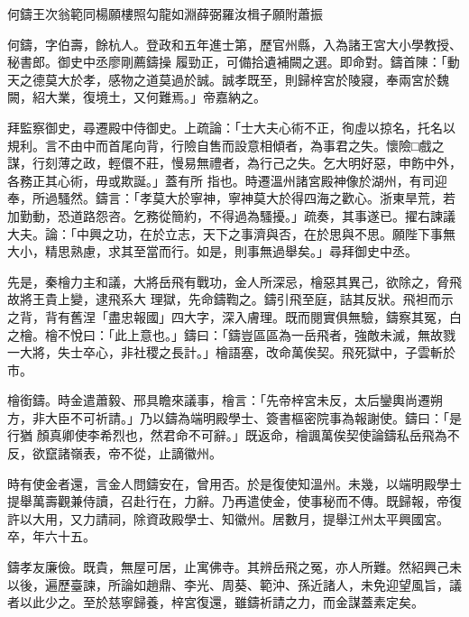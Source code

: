 
\begin{pinyinscope}

 何鑄王次翁範同楊願樓照勾龍如淵薛弼羅汝楫子願附蕭振



 何鑄，字伯壽，餘杭人。登政和五年進士第，歷官州縣，入為諸王宮大小學教授、秘書郎。御史中丞廖剛薦鑄操
 履勁正，可備拾遺補闕之選。即命對。鑄首陳：「動天之德莫大於孝，感物之道莫過於誠。誠孝既至，則歸梓宮於陵寢，奉兩宮於魏闕，紹大業，復境土，又何難焉。」帝嘉納之。



 拜監察御史，尋遷殿中侍御史。上疏論：「士大夫心術不正，徇虛以掠名，托名以規利。言不由中而首尾向背，行險自售而設意相傾者，為事君之失。懷險□戲之謀，行刻薄之政，輕儇不莊，慢易無禮者，為行己之失。乞大明好惡，申飭中外，各務正其心術，毋或欺誕。」蓋有所
 指也。時遷溫州諸宮殿神像於湖州，有司迎奉，所過騷然。鑄言：「孝莫大於寧神，寧神莫大於得四海之歡心。浙東旱荒，若加勤動，恐道路怨咨。乞務從簡約，不得過為騷擾。」疏奏，其事遂已。擢右諫議大夫。論：「中興之功，在於立志，天下之事濟與否，在於思與不思。願陛下事無大小，精思熟慮，求其至當而行。如是，則事無過舉矣。」尋拜御史中丞。



 先是，秦檜力主和議，大將岳飛有戰功，金人所深忌，檜惡其異己，欲除之，脅飛故將王貴上變，逮飛系大
 理獄，先命鑄鞫之。鑄引飛至庭，詰其反狀。飛袒而示之背，背有舊涅「盡忠報國」四大字，深入膚理。既而閱實俱無驗，鑄察其冤，白之檜。檜不悅曰：「此上意也。」鑄曰：「鑄豈區區為一岳飛者，強敵未滅，無故戮一大將，失士卒心，非社稷之長計。」檜語塞，改命萬俟契。飛死獄中，子雲斬於市。



 檜銜鑄。時金遣蕭毅、邢具瞻來議事，檜言：「先帝梓宮未反，太后鑾輿尚遷朔方，非大臣不可祈請。」乃以鑄為端明殿學士、簽書樞密院事為報謝使。鑄曰：「是行猶
 顏真卿使李希烈也，然君命不可辭。」既返命，檜諷萬俟契使論鑄私岳飛為不反，欲竄諸嶺表，帝不從，止謫徽州。



 時有使金者還，言金人問鑄安在，曾用否。於是復使知溫州。未幾，以端明殿學士提舉萬壽觀兼侍讀，召赴行在，力辭。乃再遣使金，使事秘而不傳。既歸報，帝復許以大用，又力請祠，除資政殿學士、知徽州。居數月，提舉江州太平興國宮。卒，年六十五。



 鑄孝友廉儉。既貴，無屋可居，止寓佛寺。其辨岳飛之冤，亦人所難。然紹興己未
 以後，遍歷臺諫，所論如趙鼎、李光、周葵、範沖、孫近諸人，未免迎望風旨，議者以此少之。至於慈寧歸養，梓宮復還，雖鑄祈請之力，而金謀蓋素定矣。




\end{pinyinscope}
